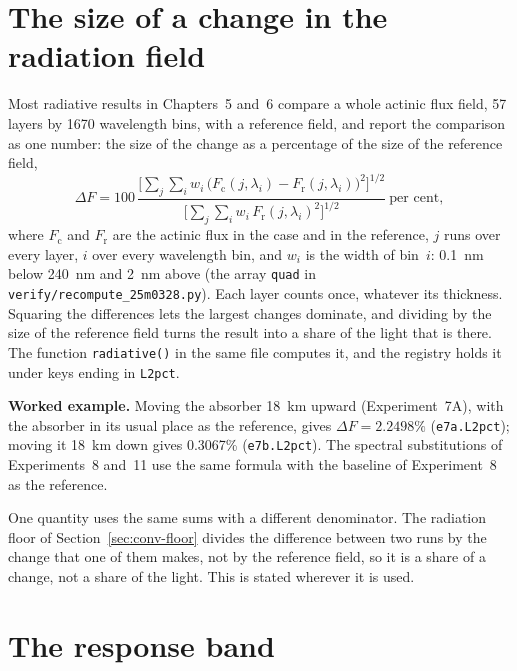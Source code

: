 \section{The size of a change in the radiation field}
\label{sec:conv-field}

Most radiative results in Chapters~5 and~6 compare a whole actinic flux field, 57 layers
by 1670 wavelength bins, with a reference field, and report the comparison as one
number: the size of the change as a percentage of the size of the reference field,
\begin{equation}
  \Delta F = 100\,
  \frac{\Big[\sum_{j}\sum_{i} w_i\,\big(F_{\mathrm{c}}(j,\lambda_i)
        - F_{\mathrm{r}}(j,\lambda_i)\big)^{2}\Big]^{1/2}}
       {\Big[\sum_{j}\sum_{i} w_i\,F_{\mathrm{r}}(j,\lambda_i)^{2}\Big]^{1/2}}
  \ \text{per cent},
  \label{eq:field}
\end{equation}
where $F_{\mathrm{c}}$ and $F_{\mathrm{r}}$ are the actinic flux in the case and in the
reference, $j$ runs over every layer, $i$ over every wavelength bin, and $w_i$ is the
width of bin~$i$: 0.1~nm below 240~nm and 2~nm above (the array \texttt{quad} in
\texttt{verify/recompute\_25m0328.py}). Each layer counts once, whatever its thickness.
Squaring the differences lets the largest changes dominate, and dividing by the size of
the reference field turns the result into a share of the light that is there. The
function \texttt{radiative()} in the same file computes it, and the registry holds it
under keys ending in \texttt{L2pct}.

\textbf{Worked example.} Moving the absorber 18~km upward (Experiment~7A), with the
absorber in its usual place as the reference, gives $\Delta F = 2.2498\%$
(\texttt{e7a.L2pct}); moving it 18~km down gives 0.3067\% (\texttt{e7b.L2pct}). The
spectral substitutions of Experiments~8 and~11 use the same formula with the baseline of
Experiment~8 as the reference.

One quantity uses the same sums with a different denominator. The radiation floor of
Section~\ref{sec:conv-floor} divides the difference between two runs by the change that
one of them makes, not by the reference field, so it is a share of a change, not a share
of the light. This is stated wherever it is used.

\section{The response band}
\label{sec:conv-band}

